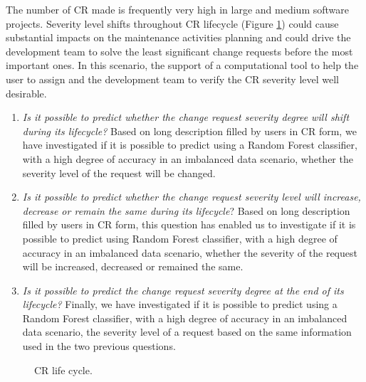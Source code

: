 \documentclass[10pt, conference]{IEEEtran}
\begin{document}
The number of CR made is frequently very high in large and medium software projects\cite{Lamkanfi2011}. Severity level shifts throughout CR lifecycle (Figure \ref{fig:cr-life-cycle}) could cause substantial impacts on the maintenance activities planning and could drive the development team to solve the least significant change requests before the most important ones. In this scenario, the support of a computational tool to help the user to assign and the development team to verify the CR severity level well desirable.


\begin{enumerate}[RQ 1:]
  \item \textit{Is it possible to predict whether the change request severity degree will shift during its lifecycle?} Based on long description filled by users in CR form, we have investigated if it is possible to predict using a Random Forest classifier, with a high degree of accuracy in an imbalanced data scenario, whether the severity level of the request will be changed.
  \item \textit{Is it possible to predict whether the change request severity level will increase, decrease or remain the same during its lifecycle}? Based on long description filled by users in CR form, this question has enabled us to investigate if it is possible to predict using Random Forest classifier, with a high degree of accuracy in an imbalanced data scenario,  whether the severity of the request will be increased, decreased or remained the same.
  \item \textit{Is it possible to predict the change request severity degree at the end of its lifecycle?} Finally, we have investigated if it is possible to predict using a Random Forest classifier, with a high degree of accuracy in an imbalanced data scenario, the severity level of a request based on the same information used in the two previous questions.
\end{enumerate}


\begin{figure}[hbt!]  
  \centering
  \caption{CR life cycle\cite{Sommerville2010}.}
  \label{fig:cr-life-cycle}
\end{figure}
\end{document}
